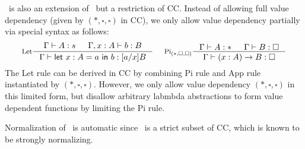 \Fi\ is also an extension of \Fw\, but a restriction of CC.  Instead of
allowing full value dependency (given by $(*,\square,\square)$ in CC),
we only allow value dependency partially via special syntax as follows:
\[
 \inference[Let]{\Gamma |- A:s & \Gamma, x:A |- b:B}
                {\Gamma |- \mathsf{let}~x:A=a~\mathsf{in}~b : [a/x]B}
 ~~~~
 \inference[Pi$_{(*,\square,\square)}$]
     {\Gamma |- A:* & \Gamma |- B:\square}
     {\Gamma |- (x:A)\to B : \square}
\]
The Let rule can be derived in CC by combining Pi rule and App rule
instantiated by $(*,\square,\square)$. However, we only allow
value dependency $(*,\square,\square)$ in this limited form, but
disallow arbitrary labmbda abstractions to form value dependent functions
by limiting the Pi rule.

Normalization of \Fi\ is automatic since \Fi\ is a strict subset of CC,
which is known to be strongly normalizing.

